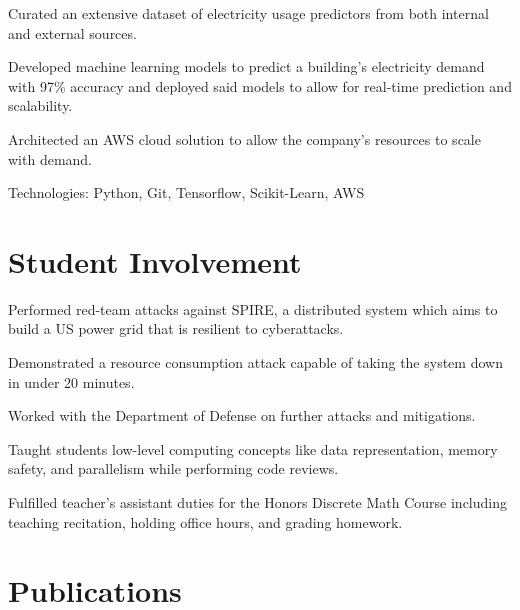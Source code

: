 \documentclass[]{deedy-resume-openfont}
\begin{document}
\begin{minipage}[t]{0.64\textwidth}
\begin{tightemize}
\item Curated an extensive dataset of electricity usage predictors from
both internal and external sources.
\item Developed machine learning models to predict a building's electricity demand with 97\% 
accuracy and deployed said models to allow for real-time prediction and scalability.
\item Architected an AWS cloud solution to allow the company's resources to scale with demand.
\item Technologies: Python, Git, Tensorflow, Scikit-Learn, AWS
\end{tightemize}
\sectionsep

\section{Student Involvement}
\descript{}
\begin{tightemize}
    \item Performed red-team attacks against SPIRE, a distributed system which aims to
    build a US power grid that is resilient to cyberattacks.
    \item Demonstrated a resource consumption attack capable of taking the system down 
    in under 20 minutes.
    \item Worked with the Department of Defense on further attacks and mitigations.
\end{tightemize}
\sectionsep

\descript{}
\begin{tightemize}
    \item Taught students low-level computing concepts like data representation, 
    memory safety, and parallelism while performing code reviews.
    \item Fulfilled teacher's assistant duties for the Honors Discrete Math Course including 
    teaching recitation, holding office hours, and grading homework.
\end{tightemize}
\sectionsep



\section{Publications} 
\renewcommand\refname{\vskip -1.5em} %

{\footnotesize
}
\nocite{*}

\end{minipage} 
\end{document}
